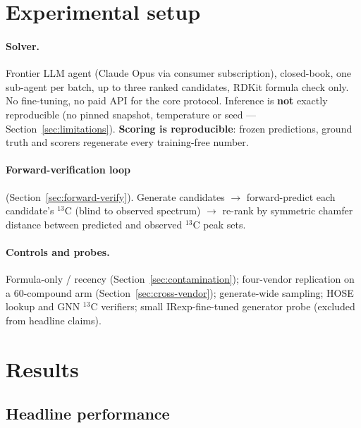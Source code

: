 \documentclass{article}
\begin{document}
\section{Experimental setup}
\label{sec:setup}

\paragraph{Solver.}
Frontier LLM agent (Claude Opus via consumer subscription), closed-book, one sub-agent per
batch, up to three ranked candidates, RDKit formula check only.
No fine-tuning, no paid API for the core protocol.
Inference is \textbf{not} exactly reproducible (no pinned snapshot, temperature or seed ---
Section~\ref{sec:limitations}).
\textbf{Scoring is reproducible}: frozen predictions, ground truth and scorers regenerate every
training-free number.

\paragraph{Forward-verification loop}
(Section~\ref{sec:forward-verify}).
Generate candidates $\to$ forward-predict each candidate's $^{13}$C (blind to observed spectrum)
$\to$ re-rank by symmetric chamfer distance between predicted and observed $^{13}$C peak sets.

\paragraph{Controls and probes.}
Formula-only / recency (Section~\ref{sec:contamination}); four-vendor replication on a
60-compound arm (Section~\ref{sec:cross-vendor}); generate-wide sampling; HOSE lookup and GNN
$^{13}$C verifiers; small IRexp-fine-tuned generator probe (excluded from headline claims).

\section{Results}
\label{sec:results}

\subsection{Headline performance}
\label{sec:headline}
\end{document}
